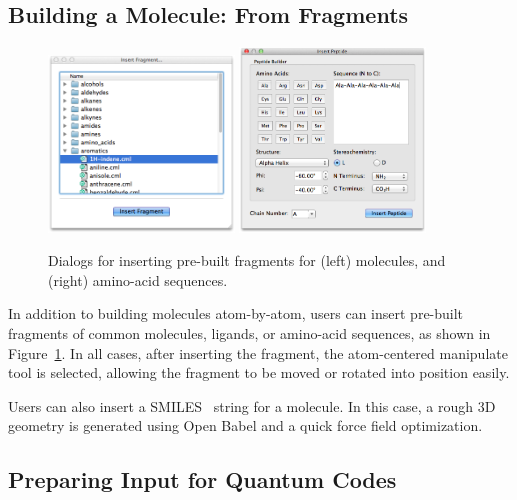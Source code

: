 \documentclass[10pt]{bmc_article}
\newenvironment{bmcformat}{\begin{raggedright}
\baselineskip20pt\sloppy\setboolean{publ}{false}}{\end{raggedright}
\baselineskip20pt\sloppy}
\begin{document}
\begin{bmcformat}
\subsection{Building a Molecule: From Fragments}

\begin{figure}
  \includegraphics[width=0.44\textwidth]{images/insert-fragment}
  \hspace{0.1cm}
  \includegraphics[width=0.44\textwidth]{images/insert-peptide}
  \caption{Dialogs for inserting pre-built fragments for (left)
    molecules, and (right) amino-acid sequences.}
  \label{f:insertdialogs}
\end{figure}

In addition to building molecules atom-by-atom, users can insert
pre-built fragments of common molecules, ligands, or amino-acid
sequences, as shown in Figure~\ref{f:insertdialogs}.
In all cases, after inserting the fragment, the atom-centered manipulate tool
is selected, allowing the fragment to be moved or rotated into
position easily.

Users can also insert a SMILES~\cite{smiles,opensmiles} string for a molecule. In
this case, a rough 3D geometry is generated using Open Babel and a
quick force field optimization.

\subsection{Preparing Input for Quantum Codes}


\end{bmcformat}
\end{document}
